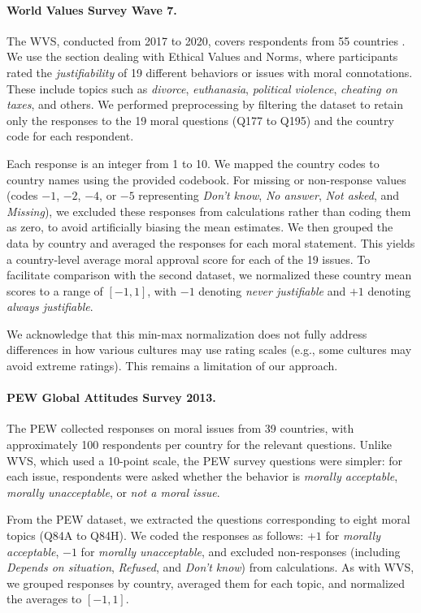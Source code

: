 \documentclass[a4paper,10pt,twoside]{article}
\begin{document}
\paragraph{World Values Survey Wave 7.} The WVS, conducted from 2017 to 2020, covers respondents from 55 countries \cite{Inglehart2014,Haerpfer2022}. We use the section dealing with Ethical Values and Norms, where participants rated the \emph{justifiability} of 19 different behaviors or issues with moral connotations. These include topics such as \emph{divorce}, \emph{euthanasia}, \emph{political violence}, \emph{cheating on taxes}, and others. We performed preprocessing by filtering the dataset to retain only the responses to the 19 moral questions (Q177 to Q195) and the country code for each respondent.

Each response is an integer from 1 to 10. We mapped the country codes to country names using the provided codebook. For missing or non-response values (codes $-1$, $-2$, $-4$, or $-5$ representing \emph{Don't know}, \emph{No answer}, \emph{Not asked}, and \emph{Missing}), we excluded these responses from calculations rather than coding them as zero, to avoid artificially biasing the mean estimates. We then grouped the data by country and averaged the responses for each moral statement. This yields a country-level average moral approval score for each of the 19 issues. To facilitate comparison with the second dataset, we normalized these country mean scores to a range of $[-1, 1]$, with $-1$ denoting \emph{never justifiable} and $+1$ denoting \emph{always justifiable}.

We acknowledge that this min-max normalization does not fully address differences in how various cultures may use rating scales (e.g., some cultures may avoid extreme ratings). This remains a limitation of our approach.

\paragraph{PEW Global Attitudes Survey 2013.} The PEW collected responses on moral issues from 39 countries, with approximately 100 respondents per country for the relevant questions. Unlike WVS, which used a 10-point scale, the PEW survey questions were simpler: for each issue, respondents were asked whether the behavior is \emph{morally acceptable}, \emph{morally unacceptable}, or \emph{not a moral issue}.

From the PEW dataset, we extracted the questions corresponding to eight moral topics (Q84A to Q84H). We coded the responses as follows: $+1$ for \emph{morally acceptable}, $-1$ for \emph{morally unacceptable}, and excluded non-responses (including \emph{Depends on situation}, \emph{Refused}, and \emph{Don't know}) from calculations. As with WVS, we grouped responses by country, averaged them for each topic, and normalized the averages to $[-1, 1]$.
\end{document}

